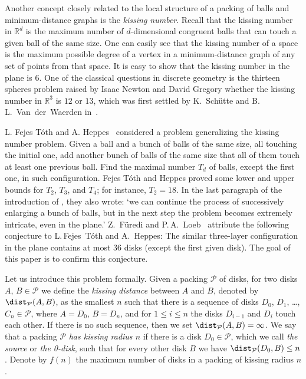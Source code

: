 Another concept closely related to the local structure of a packing of balls and minimum-distance graphs is the \emph{kissing number}. Recall that the kissing number in $\mathbb{R}^d$ is the maximum number of $d$-dimensional congruent balls that can touch a given ball of the same size. One can easily see that the kissing number of a space is the maximum possible degree of a vertex in a minimum-distance graph of any set of points from that space.
It is easy to show that the kissing number in the plane is $6$. One of the classical questions in discrete geometry is the thirteen spheres problem raised by Isaac Newton and David Gregory whether the kissing number in $\mathbb{R}^3$ is $12$ or $13$, which was first settled by K.~Sch\"{u}tte and B.\,L.~Van~der~Waerden in~\cite{schutte1952problem}. %

L. Fejes T\'{o}th and A. Heppes~\cite{toth_heppes} considered a problem generalizing the kissing number problem. Given a ball and a bunch of balls of the same size, all touching the initial one, add another bunch of balls of the same size that all of them touch at least one previous ball. Find the maximal number $T_d$ of balls, except the first one, in such configuration. Fejes T\'{o}th and Heppes proved some lower and upper bounds for $T_2$, $T_3$, and $T_4$; for instance, $T_2 = 18$. In the last paragraph of the introduction of \cite{toth_heppes}, they also wrote: `we can continue the process of
successively enlarging a bunch of balls, but in the next step the problem becomes extremely intricate, even in the plane.' %
Z.~F\"{u}redi and P.\,A.~Loeb~\cite{furedi} attribute the following conjecture to L.\,Fejes~T\'{o}th and A.~Heppes: The similar three-layer configuration in the plane contains at most $36$ disks (except the first given disk). The goal of this paper is to confirm this conjecture.

Let us introduce this problem formally. Given a packing $\mathcal{P}$ of disks, for two disks $A$, $B\in\mathcal{P}$ we define the \emph{kissing distance} between $A$ and $B$, denoted by $\dist_{\mathcal{P}}(A, B)$, as the smallest $n$ such that there is a sequence of disks $D_0$, $D_1$, \ldots, $C_n\in\mathcal{P}$, where $A = D_0$, $B = D_n$, and for $1\leq i\leq n$ the disks $D_{i-1}$ and $D_i$ touch each other. If there is no such sequence, then we set $\dist_{\mathcal{P}}(A, B) = \infty$. We say that a packing $\mathcal{P}$ \emph{has kissing radius $n$} if there is a disk $D_0\in\mathcal{P}$, which we call \emph{the source} or \emph{the 0-disk}, such that for every other disk $B$ we have $\dist_{\mathcal{P}}(D_0, B)\leq n$. Denote by $f(n)$ the maximum number of disks in a packing of kissing radius $n$.

